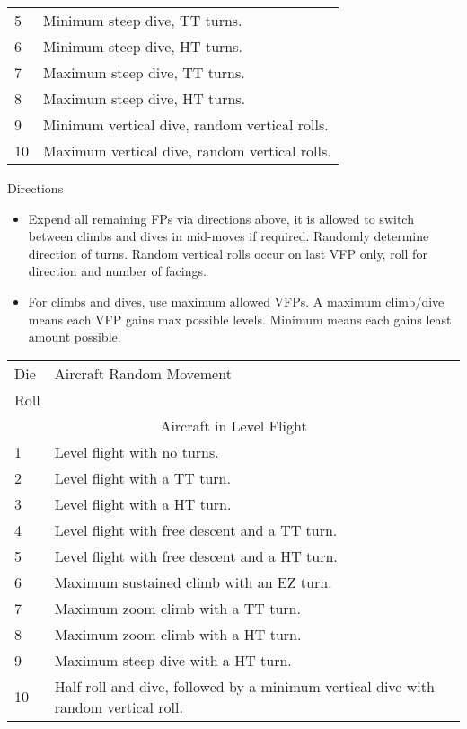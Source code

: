 \begin{onecolumntable}
{\begin{tabularx}{\linewidth}{lX}
5   &Minimum steep dive, TT turns.\\
6   &Minimum steep dive, HT turns.\\
7   &Maximum steep dive, TT turns.\\
8   &Maximum steep dive, HT turns.\\
9   &Minimum vertical dive, random vertical rolls.\\
10  &Maximum vertical dive, random vertical rolls.\\
\bottomrule
\end{tabularx}
\begin{tablenote}{\linewidth}
{\centering Directions\par\smallskip}

\begin{itemize}
    \item Expend all remaining FPs via directions above, it is allowed to switch between climbs and dives in mid-moves if required. Randomly determine direction of turns. Random vertical rolls occur on last VFP only, roll for direction and number of facings.
    \item For climbs and dives, use maximum allowed VFPs. A maximum climb/dive means each VFP gains max possible levels. Minimum means each gains least amount possible.
\end{itemize}
\end{tablenote}
}{
\small
\begin{tabularx}{\linewidth}{lX}
\toprule
Die&Aircraft Random Movement\\
Roll&\\
\midrule
\multicolumn{2}{c}{Aircraft in Level Flight}\\
\midrule
1   &Level flight with no turns.\\
2   &Level flight with a TT turn.\\
3   &Level flight with a HT turn.\\
4   &Level flight with free descent and a TT turn.\\
5   &Level flight with free descent and a HT turn.\\
6   &Maximum sustained climb with an EZ turn.\\
7   &Maximum zoom climb with a TT turn.\\
8   &Maximum zoom climb with a HT turn.\\
9   &Maximum steep dive with a HT turn.\\
10  &Half roll and dive, followed by a minimum vertical dive with random vertical roll.\\

\end{tabularx}}
\end{onecolumntable}
